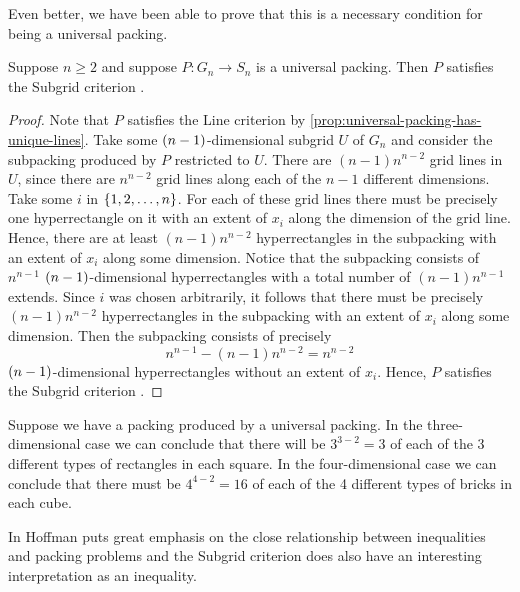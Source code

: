 \noindent Even better, we have been able to prove that this is a necessary condition for being a universal packing.

\begin{proposition}
Suppose $n \geq 2$ and suppose $P\colon G_n \to S_n$ is a universal packing. Then $P$ satisfies the Subgrid criterion .
\end{proposition}

\begin{proof}
Note that $P$ satisfies the Line criterion  by \cref{prop:universal-packing-has-unique-lines}. Take some $\left( n - 1 \right)$-dimensional subgrid $U$ of $G_n$ and consider the subpacking produced by $P$ restricted to $U$. There are $(n - 1)n^{n - 2}$ grid lines in $U$, since there are $n^{n - 2}$ grid lines along each of the $n - 1$ different dimensions. Take some $i$ in $\left\{ 1, 2, \dotsc, n \right\}$. For each of these grid lines there must be precisely one hyperrectangle on it with an extent of $x_i$ along the dimension of the grid line. Hence, there are at least $(n - 1)n^{n - 2}$ hyperrectangles in the subpacking with an extent of $x_i$ along some dimension. Notice that the subpacking consists of $n^{n - 1}$ $\left( n - 1 \right)$-dimensional hyperrectangles with a total number of $(n - 1)n^{n - 1}$ extends. Since $i$ was chosen arbitrarily, it follows that there must be precisely $(n - 1)n^{n - 2}$ hyperrectangles in the subpacking with an extent of $x_i$ along some dimension. Then the subpacking consists of precisely
\[
n^{n - 1} - (n - 1)n^{n - 2} = n^{n - 2}
\]
$\left( n - 1 \right)$-dimensional hyperrectangles without an extent of $x_i$. Hence, $P$ satisfies the Subgrid criterion .
\end{proof}

\begin{example}
Suppose we have a packing produced by a universal packing. In the three-dimensional case we can conclude that there will be $3^{3 - 2} = 3$ of each of the 3 different types of rectangles in each square. In the four-dimensional case we can conclude that there must be $4^{4 - 2} = 16$ of each of the 4 different types of bricks in each cube.
\end{example}

\noindent In \cite{Hoffman1981} Hoffman puts great emphasis on the close relationship between inequalities and packing problems and the Subgrid criterion does also have an interesting interpretation as an inequality.

